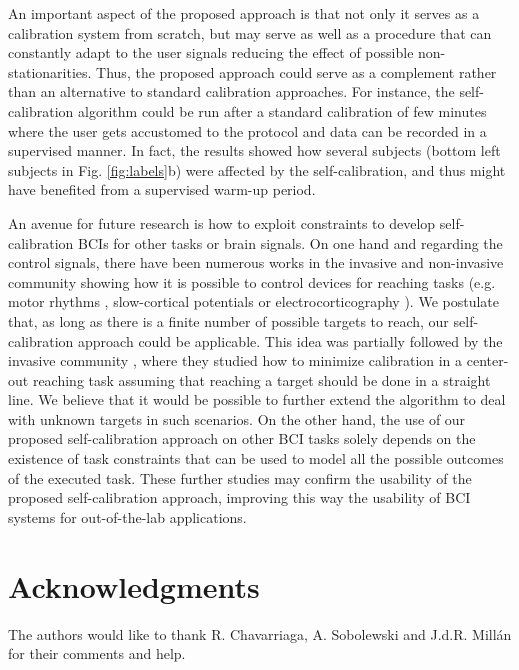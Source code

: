 \documentclass[10pt,letterpaper]{article}
\begin{document}
An important aspect of the proposed approach is that not only it serves as a calibration system from scratch, but may serve as well as a procedure that can constantly adapt to the user signals reducing the effect of possible non-stationarities. Thus, the proposed approach could serve as a complement rather than an alternative to standard calibration approaches. For instance, the self-calibration algorithm could be run after a standard calibration of few minutes where the user gets accustomed to the protocol and data can be recorded in a supervised manner. In fact, the results showed how several subjects (bottom left subjects in Fig. \ref{fig:labels}b) were affected by the self-calibration, and thus might have benefited from a supervised warm-up period.

An avenue for future research is how to exploit constraints to develop self-calibration BCIs for other tasks or brain signals. 	On one hand and regarding the control signals, there have been numerous works in the invasive and non-invasive community showing how it is possible to control devices for reaching tasks (e.g. motor rhythms \cite{mcfarland2010electroencephalographic}, slow-cortical potentials \cite{birbaumer1999spelling} or electrocorticography \cite{schalk2008two}). We postulate that, as long as there is a finite number of possible targets to reach, our self-calibration approach could be applicable. This idea was partially followed by the invasive community \cite{Orsborn12, orsborn2014closed}, where they studied how to minimize calibration in a center-out reaching task assuming that reaching a target should be done in a straight line. We believe that it would be possible to further extend the algorithm to deal with unknown targets in such scenarios. 
%
On the other hand, the use of our proposed self-calibration approach on other BCI tasks solely depends on the existence of task constraints that can be used to model all the possible outcomes of the executed task.
%
These further studies may confirm the usability of the proposed self-calibration approach, improving this way the usability of BCI systems for out-of-the-lab applications.

	





\section*{Acknowledgments}
The authors would like to thank R. Chavarriaga, A. Sobolewski and J.d.R. Mill\'{a}n for their comments and help.
\end{document}
